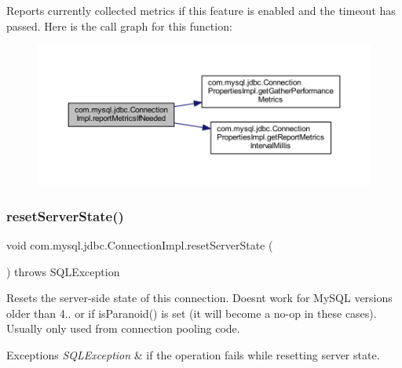Reports currently collected metrics if this feature is enabled and the timeout has passed. Here is the call graph for this function\+:\nopagebreak
\begin{figure}[H]
\begin{center}
\leavevmode
\includegraphics[width=350pt]{classcom_1_1mysql_1_1jdbc_1_1_connection_impl_a1a37a441754ebb5ba04461128442427a_cgraph}
\end{center}
\end{figure}
\mbox{\label{classcom_1_1mysql_1_1jdbc_1_1_connection_impl_a1335fc09ccb7954de9bffc4b59a489aa}} 
\subsubsection{\texorpdfstring{reset\+Server\+State()}{resetServerState()}}
{\footnotesize\ttfamily void com.\+mysql.\+jdbc.\+Connection\+Impl.\+reset\+Server\+State (\begin{DoxyParamCaption}{ }\end{DoxyParamCaption}) throws S\+Q\+L\+Exception}

Resets the server-\/side state of this connection. Doesn\textquotesingle{}t work for My\+S\+QL versions older than 4.. or if is\+Paranoid() is set (it will become a no-\/op in these cases). Usually only used from connection pooling code.


\begin{DoxyExceptions}{Exceptions}
{\em S\+Q\+L\+Exception} & if the operation fails while resetting server state. \\
\hline
\end{DoxyExceptions}


